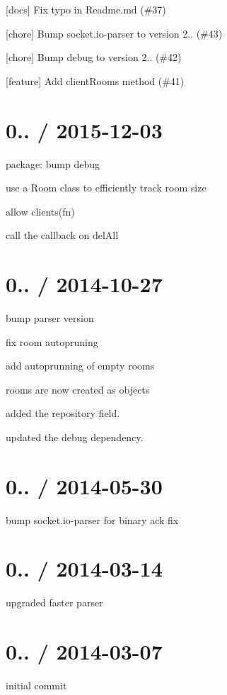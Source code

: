 
\begin{DoxyItemize}
\item \mbox{[}docs\mbox{]} Fix typo in Readme.\+md (\#37)
\item \mbox{[}chore\mbox{]} Bump socket.\+io-\/parser to version 2.. (\#43)
\item \mbox{[}chore\mbox{]} Bump debug to version 2.. (\#42)
\item \mbox{[}feature\mbox{]} Add client\+Rooms method (\#41)
\end{DoxyItemize}

\section*{0.. / 2015-\/12-\/03 }


\begin{DoxyItemize}
\item package\+: bump {\ttfamily debug}
\item use a {\ttfamily Room} class to efficiently track room size
\item allow {\ttfamily clients(fn)}
\item call the callback on {\ttfamily del\+All}
\end{DoxyItemize}

\section*{0.. / 2014-\/10-\/27 }


\begin{DoxyItemize}
\item bump parser version
\item fix room autopruning
\item add autoprunning of empty rooms
\item rooms are now created as objects
\item added the repository field.
\item updated the debug dependency.
\end{DoxyItemize}

\section*{0.. / 2014-\/05-\/30 }


\begin{DoxyItemize}
\item bump {\ttfamily socket.\+io-\/parser} for binary ack fix
\end{DoxyItemize}

\section*{0.. / 2014-\/03-\/14 }


\begin{DoxyItemize}
\item upgraded faster parser
\end{DoxyItemize}

\section*{0.. / 2014-\/03-\/07 }


\begin{DoxyItemize}
\item initial commit 
\end{DoxyItemize}